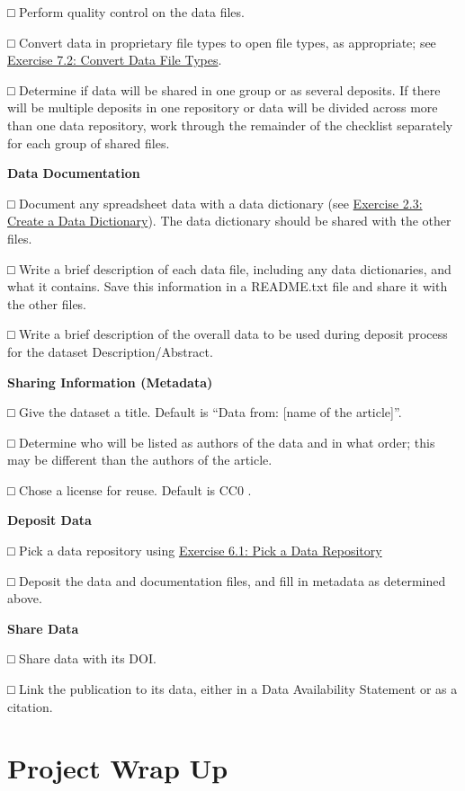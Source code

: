 \documentclass[
]{book}
\begin{document}
□ Perform quality control on the data files.

□ Convert data in proprietary file types to open file types, as appropriate; see \protect\hyperlink{file-type}{Exercise 7.2: Convert Data File Types}.

□ Determine if data will be shared in one group or as several deposits. If there will be multiple deposits in one repository or data will be divided across more than one data repository, work through the remainder of the checklist separately for each group of shared files.

\textbf{Data Documentation}

□ Document any spreadsheet data with a data dictionary (see \protect\hyperlink{data-dictionary}{Exercise 2.3: Create a Data Dictionary}). The data dictionary should be shared with the other files.

□ Write a brief description of each data file, including any data dictionaries, and what it contains. Save this information in a README.txt file and share it with the other files.

□ Write a brief description of the overall data to be used during deposit process for the dataset Description/Abstract.

\textbf{Sharing Information (Metadata)}

□ Give the dataset a title. Default is ``Data from: {[}name of the article{]}''.

□ Determine who will be listed as authors of the data and in what order; this may be different than the authors of the article.

□ Chose a license for reuse. Default is CC0 \citep{creative_commons_wiki_cc0_2014}.

\textbf{Deposit Data}

□ Pick a data repository using \protect\hyperlink{data-repository}{Exercise 6.1: Pick a Data Repository}

□ Deposit the data and documentation files, and fill in metadata as determined above.

\textbf{Share Data}

□ Share data with its DOI.

□ Link the publication to its data, either in a Data Availability Statement or as a citation.

\hypertarget{project-wrap-up}{%
\chapter{Project Wrap Up}\label{project-wrap-up}}
\end{document}
